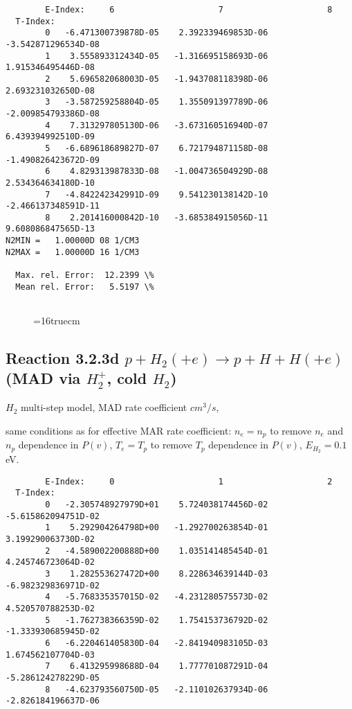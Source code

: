 \documentclass[12pt,dvipdfmx]{article}
\begin{document}
{\begin{small}
\begin{verbatim}
        E-Index:     6                     7                     8
  T-Index:
        0   -6.471300739878D-05    2.392339469853D-06   -3.542871296534D-08
        1    3.555893312434D-05   -1.316695158693D-06    1.915346495446D-08
        2    5.696582068003D-05   -1.943708118398D-06    2.693231032650D-08
        3   -3.587259258804D-05    1.355091397789D-06   -2.009854793386D-08
        4    7.313297805130D-06   -3.673160516940D-07    6.439394992510D-09
        5   -6.689618689827D-07    6.721794871158D-08   -1.490826423672D-09
        6    4.829313987833D-08   -1.004736504929D-08    2.534364634180D-10
        7   -4.842242342991D-09    9.541230138142D-10   -2.466137348591D-11
        8    2.201416000842D-10   -3.685384915056D-11    9.608086847565D-13
N2MIN =   1.00000D 08 1/CM3
N2MAX =   1.00000D 16 1/CM3

  Max. rel. Error:  12.2399 \%
  Mean rel. Error:   5.5197 \%


\end{verbatim}\end{small}
\begin{figure} \label{2.2.5mar}
\epsfxsize=16truecm
\end{figure}
\newpage

\subsection{
Reaction 3.2.3d   $p + H_2 (+e)   \rightarrow p + H + H (+e) $ (MAD via $H_2^+$, cold $H_2$)
}

$H_2$ multi-step model, MAD rate coefficient $cm^3/s$,

same conditions as for effective MAR rate coefficient: $n_e=n_p$ to remove $n_e$ and $n_p$ dependence in $P(v)$,
$T_e=T_p$ to remove $T_p$ dependence in $P(v)$,  $E_{H_2}=0.1$ eV.

\begin{small}\begin{verbatim}
        E-Index:     0                     1                     2
  T-Index:
        0   -2.305748927979D+01    5.724038174456D-02   -5.615862094751D-02
        1    5.292904264798D+00   -1.292700263854D-01    3.199290063730D-02
        2   -4.589002200888D+00    1.035141485454D-01    4.245746723064D-02
        3    1.282553627472D+00    8.228634639144D-03   -6.982329836971D-02
        4   -5.768335357015D-02   -4.231280575573D-02    4.520570788253D-02
        5   -1.762738366359D-02    1.754153736792D-02   -1.333930685945D-02
        6   -6.220461405830D-04   -2.841940983105D-03    1.674562107704D-03
        7    6.413295998688D-04    1.777701087291D-04   -5.286124278229D-05
        8   -4.623793560750D-05   -2.110102637934D-06   -2.826184196637D-06


\end{verbatim}
\end{small}}
\end{document}
